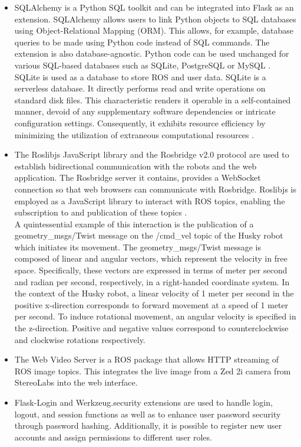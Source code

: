 \documentclass[conference]{IEEEtran}
\begin{document}
\begin{itemize}
\item SQLAlchemy is a Python SQL toolkit and can be integrated into Flask as an extension. SQLAlchemy allows users to link Python objects to SQL databases using Object-Relational Mapping (ORM). This allows, for example, database queries to be made using Python code instead of SQL commands. The extension is also database-agnostic. 
Python code can be used unchanged for various SQL-based databases such as SQLite, PostgreSQL or MySQL \cite{sqlalchemy}. 
SQLite is used as a database to store ROS and user data. SQLite is a serverless database. It directly performs read and write operations on standard disk files. This characteristic renders it operable in a self-contained manner, devoid of any supplementary software dependencies or intricate configuration settings. Consequently, it exhibits resource efficiency by minimizing the utilization of extraneous computational resources \cite{sqlite}.
\item The Roslibjs JavaScript library and the Rosbridge v2.0 protocol are used to establish bidirectional communication with the robots and the web application. The Rosbridge server it contains, provides a WebSocket connection so that web browsers can communicate with Rosbridge.
Roslibjs is employed as a JavaScript library to interact with ROS topics, enabling the subscription to and publication of these topics \cite{rosbridgeOkState} \cite{rosbridgeSuite}.\\ A quintessential example of this interaction is the publication of a geometry\_msgs/Twist message on the /cmd\_vel topic of the Husky robot which initiates its movement.
The geometry\_msgs/Twist message is composed of linear and angular vectors, which represent the velocity in free space. Specifically, these vectors are expressed in terms of meter per second and radian per second, respectively, in a right-handed coordinate system.
In the context of the Husky robot, a linear velocity of 1 meter per second in the positive x-direction corresponds to forward movement at a speed of 1 meter per second. To induce rotational movement, an angular velocity is specified in the z-direction. Positive and negative values correspond to counterclockwise and clockwise rotations respectively.
\item The Web Video Server is a ROS package that allows HTTP streaming of ROS image topics. This integrates the live image from a Zed 2i camera from StereoLabs into the web interface.
\item Flask-Login and Werkzeug.security extensions are used to handle login, logout, and session functions as well as to enhance user password security through password hashing. Additionally, it is possible to register new user accounts and assign permissions to different user roles. 
\end{itemize}
\end{document}
